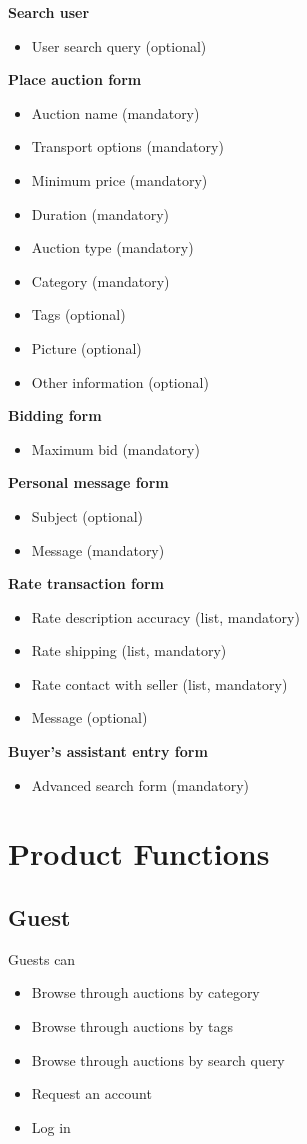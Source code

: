 	\textbf{Search user}
		\begin{itemize}
			\item User search query (optional)
		\end{itemize}
	\textbf{Place auction form}
		\begin{itemize}
			\item Auction name (mandatory)
			\item Transport options (mandatory)
			\item Minimum price (mandatory)
			\item Duration (mandatory)
			\item Auction type (mandatory)
			\item Category (mandatory)
			\item Tags (optional)
			\item Picture (optional)
			\item Other information (optional)
		\end{itemize}
	\textbf{Bidding form}
		\begin{itemize}
			\item Maximum bid (mandatory)
		\end{itemize}
	\textbf{Personal message form}
		\begin{itemize}
			\item Subject (optional)
			\item Message (mandatory)
		\end{itemize}
	\textbf{Rate transaction form}
		\begin{itemize}
			\item Rate description accuracy (list, mandatory)
			\item Rate shipping (list, mandatory)
			\item Rate contact with seller (list, mandatory)
			\item Message (optional)
		\end{itemize}
	\textbf{Buyer's assistant entry form}
		\begin{itemize}
			\item Advanced search form (mandatory)
		\end{itemize}
		
\section{Product Functions}

	\subsection{Guest}
		Guests can
		\begin{itemize}
			\item Browse through auctions by category
			\item Browse through auctions by tags
			\item Browse through auctions by search query
			\item Request an account
			\item Log in
		\end{itemize}
